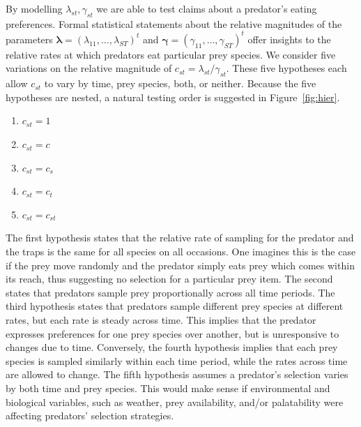 \documentclass[12pt]{article}
\begin{document}
By modelling $\lambda_{st}, \gamma_{st}$ we are able to test claims about a predator's eating preferences.  Formal statistical statements about the relative magnitudes of the parameters $\boldsymbol{\lambda} = (\lambda_{11}, \ldots, \lambda_{ST})^t$ and $\boldsymbol{\gamma} = (\gamma_{11}, \ldots, \gamma_{ST})^t$ offer insights to the relative rates at which predators eat particular prey species.  We consider five variations on the relative magnitude of $c_{st} = \lambda_{st}/\gamma_{st}$.  These five hypotheses each allow $c_{st}$ to vary by time, prey species, both, or neither.  Because the five hypotheses are nested, a natural testing order is suggested in Figure~\ref{fig:hier}.

\begin{enumerate}
\item $c_{st} = 1$
\item $c_{st} = c$
\item $c_{st} = c_s$
\item $c_{st} = c_t$
\item $c_{st} = c_{st}$
\end{enumerate}

\noindent The first hypothesis states that the relative rate of sampling for the predator and the traps is the same for all species on all occasions.  One imagines this is the case if the prey move randomly and the predator simply eats prey which comes within its reach, thus suggesting no selection for a particular prey item.  The second states that predators sample prey proportionally across all time periods.  The third hypothesis states that predators sample different prey species at different rates, but each rate is steady across time.  This implies that the predator expresses preferences for one prey species over another, but is unresponsive to changes due to time.  Conversely, the fourth hypothesis implies that each prey species is sampled similarly within each time period, while the rates across time are allowed to change.  The fifth hypothesis assumes a predator's selection varies by both time and prey species.  This would make sense if environmental and biological variables, such as weather, prey availability, and/or palatability were affecting predators' selection strategies.  
\end{document}
